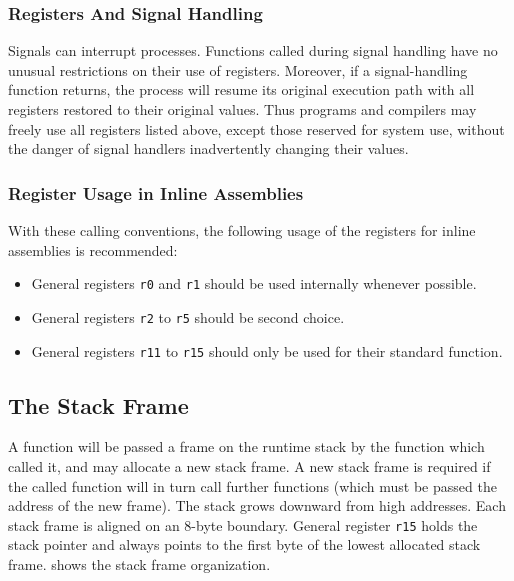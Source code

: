 \documentclass[USenglish,fontsize=11pt,twoside,%
  toc=bib,toc=idx,toc=graduated,numbers=noendperiod,
  bookmarks=true,
  bookmarksnumbered=true,
  bookmarksopen=true,
  bookmarksopenlevel=1,
  breaklinks=true,
  colorlinks=true,
  linkcolor=black,
  pdfpagelayout={TwoPageRight},
  pdfusetitle=true
]{scrreprt}
\begin{document}
\subsubsection{Registers And Signal Handling}
Signals can interrupt processes.  Functions called during signal
handling have no unusual restrictions on their use of registers.
Moreover, if a signal-handling function returns, the process will
resume its original execution path with all registers restored to
their original values.  Thus programs and compilers may freely use all
registers listed above, except those reserved for system use, without
the danger of signal handlers inadvertently changing their values.

\subsubsection{Register Usage in Inline Assemblies}

With these calling conventions, the following usage of the registers
for inline assemblies is recommended:
\begin{itemize}
\item General registers \texttt{r0} and \texttt{r1} should be used
  internally whenever possible.
\item General registers \texttt{r2} to \texttt{r5} should be second
  choice.
\item General registers \texttt{r11} to \texttt{r15} should only be
  used for their standard function.
\end{itemize}

\subsection{The Stack Frame}
\label{stackframe}

A function will be passed a frame on the runtime stack by the function
which called it, and may allocate a new stack frame.  A new stack frame is
required if the called function will in turn call further functions (which
must be passed the address of the new frame).  The stack grows downward
from high addresses.  Each stack frame is aligned on an 8-byte boundary.
General register \texttt{r15} holds the stack pointer and always
points to the first byte of the lowest allocated stack frame.
 shows the stack frame organization.
\end{document}
